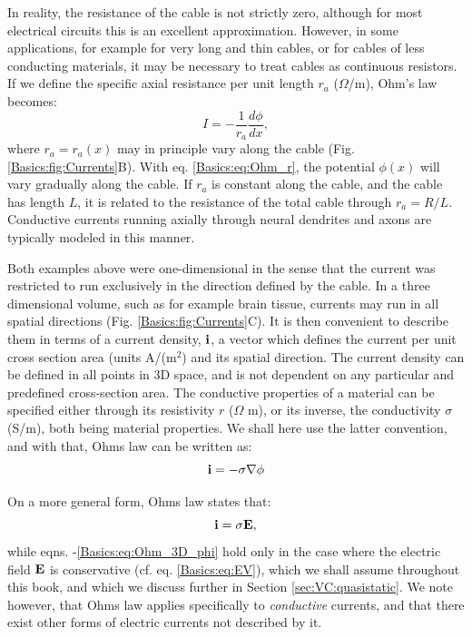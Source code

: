 In reality, the resistance of the cable is not strictly zero, although for most electrical circuits this is an excellent approximation. However, in some applications, for example for very long and thin cables, or for cables of less conducting materials, it may be necessary to treat cables as continuous resistors. If we define the specific axial resistance per unit length $r_{a}$ ($\Omega$/m), Ohm's law becomes: 
\begin{equation}
I = - \frac{1}{r_a}\frac{d\phi}{dx}, 
\label{Basics:eq:Ohm_r}
\end{equation}
where $r_a=r_a(x)$ may in principle vary along the cable (Fig. \ref{Basics:fig:Currents}B). With eq. \ref{Basics:eq:Ohm_r}, the potential $\phi(x)$ will vary gradually along the cable. If $r_a$ is constant along the cable, and the cable has length $L$, it is related to the resistance of the total cable through $r_a=R/L$. Conductive currents running axially through neural dendrites and axons are typically modeled in this manner. 

Both examples above were one-dimensional in the sense that the current was restricted to run exclusively in the direction defined by the cable. In a three dimensional volume, such as for example brain tissue, currents may run in all spatial directions (Fig. \ref{Basics:fig:Currents}C). It is then convenient to describe them in terms of a current density, ${\bf i}$,  a vector which defines the current per unit cross section area (units A/(m$^2$) and its spatial direction. The current density can be defined in all points in 3D space, and is not dependent on any particular and predefined cross-section area. The conductive properties of a material can be specified either through its resistivity $r$ ($\Omega$ m), or its inverse, the conductivity $\sigma$ (S/m), both being material properties. We shall here use the latter convention, and with that, Ohms law can be written as:
\begin{equation}
{\bf i} = - \sigma \nabla \phi
\label{Basics:eq:Ohm_3D_phi}
\end{equation}

On a more general form, Ohms law states that:
\begin{equation}
{\bf i} = \sigma {\bf E}, 
\label{Basics:eq:Ohm_general}
\end{equation}
while eqns. \label{Basics:eq:Ohm_R}-\ref{Basics:eq:Ohm_3D_phi} hold only in the case where the electric field ${\bf E}$ is conservative (cf. eq. \ref{Basics:eq:EV}), which we shall assume throughout this book, and which we discuss further in Section \ref{sec:VC:quasistatic}. We note however, that Ohms law applies specifically to \textit{conductive} currents, and that there exist other forms of electric currents not described by it.


